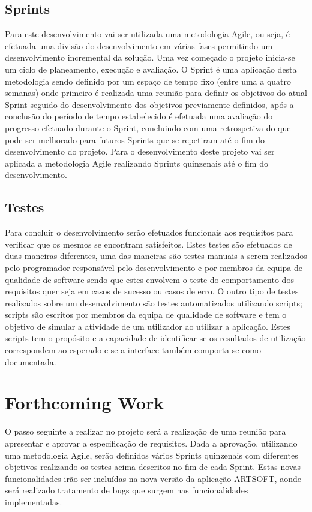\documentclass[sigplan]{acmart}
\begin{document}
\subsection{Sprints}

Para este desenvolvimento vai ser utilizada uma metodologia Agile, ou seja, é efetuada uma divisão do desenvolvimento em várias fases permitindo um desenvolvimento incremental da solução. Uma vez começado o projeto inicia-se um ciclo de planeamento, execução e avaliação. O Sprint é uma aplicação desta metodologia sendo definido por um espaço de tempo fixo (entre uma a quatro semanas) onde primeiro é realizada uma reunião para definir os objetivos do atual Sprint seguido do desenvolvimento dos objetivos previamente definidos, após a conclusão do período de tempo estabelecido é efetuada uma avaliação do progresso efetuado durante o Sprint, concluindo com uma retrospetiva do que pode ser melhorado para futuros Sprints que se repetiram até o fim do desenvolvimento do projeto. Para o desenvolvimento deste projeto vai ser aplicada a metodologia Agile realizando Sprints quinzenais até o fim do desenvolvimento.


\subsection{Testes}

Para concluir o desenvolvimento serão efetuados funcionais aos requisitos para verificar que os mesmos se encontram satisfeitos. Estes testes são efetuados de duas maneiras diferentes, uma das maneiras são testes manuais a serem realizados pelo programador responsável pelo desenvolvimento e por membros da equipa de qualidade de software sendo que estes envolvem o teste do comportamento dos requisitos quer seja em casos de sucesso ou casos de erro. O outro tipo de testes realizados sobre um desenvolvimento são testes automatizados utilizando scripts; scripts são escritos por membros da equipa de qualidade de software e tem o objetivo de simular a atividade de um utilizador ao utilizar a aplicação. Estes scripts tem o propósito e a capacidade de identificar se os resultados de utilização correspondem ao esperado e se a interface também comporta-se como documentada.

\section{Forthcoming Work} \label{sec:forthcomingwork}

O passo seguinte a realizar no projeto será a realização de uma reunião para apresentar e aprovar a especificação de requisitos. Dada a aprovação, utilizando uma metodologia Agile, serão definidos vários Sprints quinzenais com diferentes objetivos realizando os testes acima descritos no fim de cada Sprint. Estas novas funcionalidades irão ser incluídas na nova versão da aplicação ARTSOFT, aonde será realizado tratamento de bugs que surgem nas funcionalidades implementadas.



\end{document}
